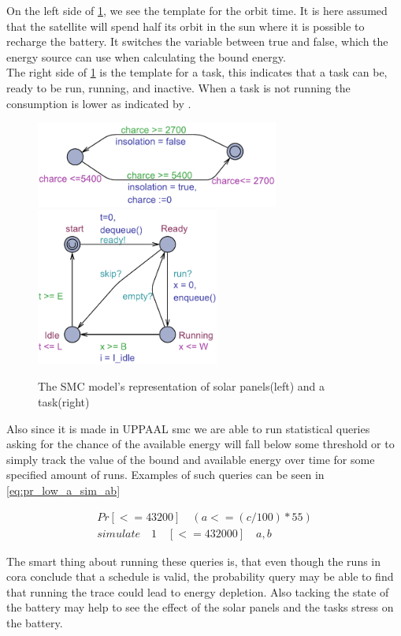 On the left side of \cref{fig:solar_task}, we see the template for the orbit time. It is here assumed that the satellite will spend half its orbit in the sun where it is possible to recharge the battery. It switches the variable  between true and false, which the energy source can use when calculating the bound energy.\\
The right side of \cref{fig:solar_task} is the template for a task, this indicates that a task can be, ready to be run, running, and inactive. When a task is not running the consumption is lower as indicated by .

\begin{figure}[H]%
	\centering
	\subfloat
	{{\includegraphics[width=8cm]{graphics/smc_solar.pdf} }}%
	\qquad
	\subfloat
	{{\includegraphics[width=6cm]{graphics/smc_task.pdf} }}%
	\caption{The SMC model's representation of solar panels(left) and a task(right)}%
	\label{fig:solar_task}%
\end{figure}
Also since it is made in UPPAAL \gls{smc} we are able to run statistical queries asking for the chance of the available energy will fall below some threshold or to simply track the value of the bound and available energy over time for some specified amount of runs. Examples of such queries can be seen in \cref{eq:pr_low_a_sim_ab}

\begin{align}
Pr[<= 43200] \quad(a <= (c/100)*55)		\nonumber \\
simulate \quad 1 \quad [<=432000] \quad {a,b} 
\label{eq:pr_low_a_sim_ab}
\end{align}

The smart thing about running these queries is, that even though the runs in \gls{cora} conclude that a schedule is valid, the probability query may be able to find that running the trace could lead to energy depletion. Also tacking the state of the battery may help to see the effect of the solar panels and the tasks stress on the battery.

